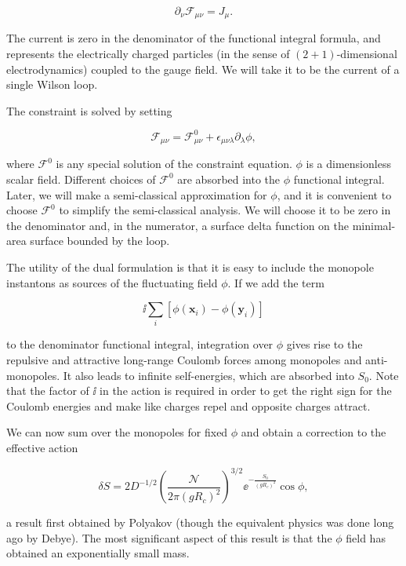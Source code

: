 \[
  \partial_\nu\mathcal F_{\mu\nu}=J_\mu.
\]

The current is zero in the denominator of the functional integral formula, and
represents the electrically charged particles (in the sense of $(2+1)$-dimensional
electrodynamics) coupled to the gauge field. We will take it to be the current
of a single Wilson loop.

The constraint is solved by setting

\[
  \mathcal F_{\mu\nu}=\mathcal F^0_{\mu\nu}
  +\epsilon_{\mu\nu\lambda}\partial_\lambda\phi,
\]

where $\mathcal F^0$ is any special solution of the constraint equation. $\phi$
is a dimensionless scalar field. Different choices of $\mathcal F^0$ are
absorbed into the $\phi$ functional integral. Later, we will make a
semi-classical approximation for $\phi$, and it is convenient to choose
${\mathcal F}^0$ to simplify the semi-classical analysis. We will choose it to be
zero in the denominator and, in the numerator, a surface delta function on the
minimal-area surface bounded by the loop.

The utility of the dual formulation is that it is easy to include the monopole
instantons as sources of the fluctuating field $\phi$. If we add the term

\[
  \ii\sum_i[\phi(\mathbf x_i)-\phi(\mathbf y_i)]
\]

to the denominator functional integral, integration over $\phi$ gives rise to
the repulsive and attractive long-range Coulomb forces among monopoles and
anti-monopoles. It also leads to infinite self-energies, which are absorbed into
$S_0$. Note that the factor of $\ii$ in the action is required in order to get
the right sign for the Coulomb energies and make like charges repel and opposite
charges attract.

We can now sum over the monopoles for fixed $\phi$ and obtain a correction to
the effective action

\[
  \delta S=2D^{-1/2}
  \left(\frac{\mathcal N}{2\pi(gR_c)^2}\right)^{3/2}
  \ee^{-\frac{S_0}{(gR_c)^2}}\cos\phi,
\]

a result first obtained by Polyakov (though the equivalent physics was done long
ago by Debye). The most significant aspect of this result is that the $\phi$
field has obtained an exponentially small mass.

